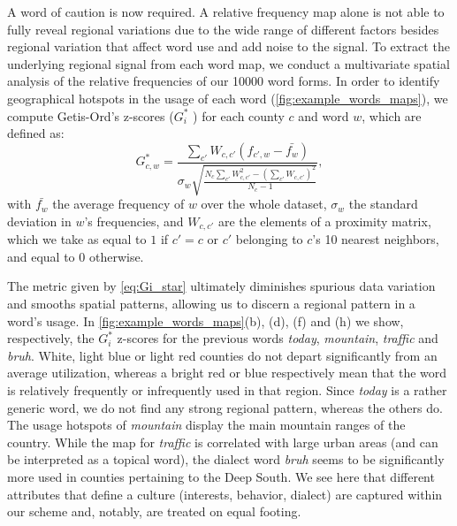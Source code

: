 \documentclass[../thesis.tex]{subfiles}
\begin{document}
A word of caution is now required. A relative frequency map alone is not able to fully
reveal regional variations due to the wide range of different factors besides regional
variation that affect word use and add noise to the signal. To extract the underlying
regional signal from each word map, we conduct a multivariate spatial analysis
\cite{GrieveStatisticalMethod2011,GrieveRegionalVariation2016} of the relative
frequencies of our \SI{10000}{} word forms. In order to identify geographical hotspots
in the usage of each word (\cref{fig:example_words_maps}), we compute Getis-Ord's
z-scores ($G_i^*$ \cite{OrdLocalSpatial1995}) for each county $c$ and word $w$, which
are defined as:
\begin{equation}
\label{eq:Gi_star}
  G_{c, w}^* = \frac{
      \sum_{c'} W_{c, c'} (f_{c', w} - \bar{f_w})
    }{
      \sigma_w \sqrt{\frac{
        N_c \sum_{c'} W_{c, c'}^2
          - \left( \sum_{c'} W_{c, c'} \right)^2
        }{
          N_c - 1
        }
      }
    },
\end{equation}
with $\bar{f_w}$ the average frequency of $w$ over the whole dataset, $\sigma_w$ the
standard deviation in $w$'s frequencies, and $W_{c, c'}$ are the elements of a proximity
matrix, which we take as equal to $1$ if $c' = c$ or $c'$ belonging to $c$'s 10 nearest
neighbors, and equal to $0$ otherwise.

The metric given by \cref{eq:Gi_star} ultimately diminishes spurious data variation and
smooths spatial patterns, allowing us to discern a regional pattern in a word's usage.
In \cref{fig:example_words_maps}(b), (d), (f) and (h) we show, respectively, the $G_i^*$
z-scores for the previous words \textit{today}, \textit{mountain}, \textit{traffic} and
\textit{bruh}. White, light blue or light red counties do not depart significantly from
an average utilization, whereas a bright red or blue respectively mean that the word is
relatively frequently or infrequently used in that region. Since \textit{today} is a
rather generic word, we do not find any strong regional pattern, whereas the others do.
The usage hotspots of \textit{mountain} display the main mountain ranges of the country.
While the map for \textit{traffic} is correlated with large urban areas (and can be
interpreted as a topical word), the dialect word \textit{bruh} seems to be significantly
more used in counties pertaining to the Deep South. We see here that different
attributes that define a culture (interests, behavior, dialect) are captured within our
scheme and, notably, are treated on equal footing.
\end{document}
